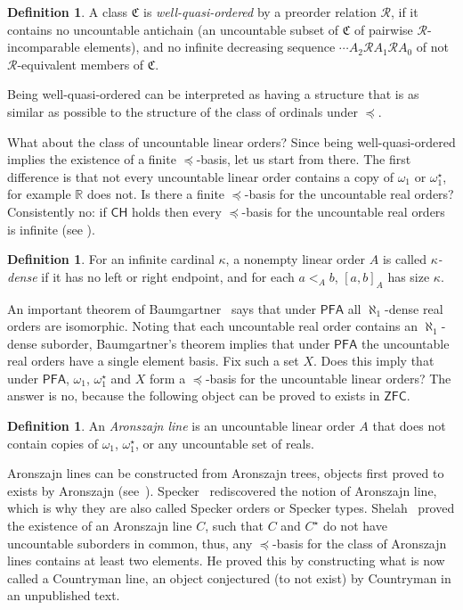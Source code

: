 \documentclass[10pt]{amsart}
\theoremstyle{definition}
\newtheorem{definition}[theorem]{Definition}
\theoremstyle{remark}
\newcommand{\axiom}[1]{\mathsf{#1}}
\newcommand{\ZFC}{\axiom{ZFC}}
\newcommand{\CH}{\axiom{CH}}
\newcommand{\PFA}{\axiom{PFA}}
\newcommand{\eleq}{\preceq}
\newcommand{\1}{\mathbbm{1}}
\begin{document}
\begin{definition}\label{df:wqo}
  A class $\mathfrak{C}$ is \emph{well-quasi-ordered} by a preorder relation $\mathcal{R}$,
  if it contains no uncountable antichain (an uncountable subset of $\mathfrak{C}$
  of pairwise $\mathcal{R}$-incomparable elements), and no infinite decreasing
  sequence $\cdots A_{2} \mathrel{\mathcal{R}} A_{1} \mathrel{\mathcal{R}} A_{0}$ of not
  $\mathcal{R}$-equivalent members of $\mathfrak{C}$.
\end{definition}

Being well-quasi-ordered can be interpreted as having a structure that is as similar
as possible to the structure of the class of ordinals under $\eleq$.

What about the class of uncountable linear orders? Since being well-quasi-ordered
implies the existence of a finite $\eleq$-basis, let us start from there. The first
difference is that not every uncountable linear order contains a copy
of $\omega_{1}$ or $\omega_{1}^{\star}$, for example $\mathbb{R}$ does not. Is
there a finite $\eleq$-basis for the uncountable real orders? Consistently no:
if $\CH$ holds then every $\eleq$-basis for the uncountable real orders is infinite (see \cite{Baumgartner1982}).

\begin{definition}
  For an infinite cardinal $\kappa$, a nonempty linear order $A$ is called
  \emph{$\kappa$-dense} if it has no left or right endpoint,
  and for each $a <_{A} b$, ${[a,b]}_{A}$ has size $\kappa$.
\end{definition}

An important theorem of Baumgartner~\cite{Baumgartner1973} says that
under $\PFA$ all $\aleph_{1}$-dense real orders are isomorphic.
Noting that each uncountable real order contains an $\aleph_{1}$-dense
suborder, Baumgartner's theorem implies that
under $\PFA$ the uncountable real orders have a single element
basis.
Fix such a set $X$. Does this imply that under $\PFA$, $\omega_{1}$, $\omega_{1}^{\star}$
and $X$ form a $\eleq$-basis for the uncountable linear orders? The answer is no,
because the following object can be proved to exists in $\ZFC$.

\begin{definition}
  An \emph{Aronszajn line} is an uncountable linear order $A$ that does
  not contain copies of $\omega_{1}$, $\omega_{1}^{\star}$, or any uncountable
  set of reals.
\end{definition}

Aronszajn lines can be constructed from Aronszajn trees, objects first
proved to exists by Aronszajn (see~\cite{Kurepa1935}).
Specker~\cite{Specker1949} rediscovered the notion of Aronszajn line,
which is why they are also called Specker orders or Specker types.
Shelah~\cite{Shelah1976} proved the existence of an Aronszajn line $C$,
such that $C$ and $C^{\star}$ do not have uncountable suborders in common,
thus, any $\eleq$-basis for the class of Aronszajn lines contains at least two elements.
He proved this by constructing what is now called a Countryman line, an object
conjectured (to not exist) by Countryman in an unpublished text.
\end{document}
